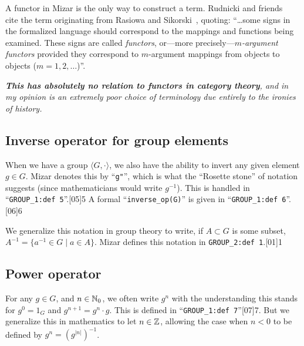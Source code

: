 \begin{remark}
A functor in Mizar is the only way to construct a term. Rudnicki and
friends~\cite{rudnicki2001commutative} cite the term originating from
Rasiowa and Sikorski~\cite[see p.148]{rasiowa1963mathematics},
quoting: ``\dots some signs in the formalized language should correspond
to the mappings and functions being examined. These signs are called
\emph{functors}, or---more precisely---\emph{$m$-argument functors}
provided they correspond to $m$-argument mappings from objects to
objects ($m = 1, 2, \dots$)''.

\emph{\textbf{This has absolutely no relation to functors in category theory},
and in my opinion is an extremely poor
choice of terminology due entirely to the ironies of history.}
\end{remark}

\subsection{Inverse operator for group elements}
When we have a group $\langle G,\cdot\rangle$, we also have the ability
to invert any given element $g\in G$. Mizar denotes this by
``\verb#g"#'', which is what the ``Rosette stone'' of notation suggests
(since mathematicians would write $g^{-1}$). This is handled in
``\verb#GROUP_1:def 5#''.[05]{5}
A formal ``\verb#inverse_op(G)#'' is given in
``\verb#GROUP_1:def 6#''.[06]{6}

\begin{remark}
We generalize this notation in group theory to write, if $A\subset G$ is
some subset, $A^{-1}=\{a^{-1}\in G\mid a\in A\}$. Mizar defines this
notation in \verb#GROUP_2:def 1#.[01]{1}
\end{remark}

\subsection{Power operator}
For any $g\in G$, and $n\in\mathbb{N}_{0}$, we often write $g^{n}$ with the
understanding this stands for $g^{0}=1_{G}$ and $g^{n+1}=g^{n}\cdot g$.
This is defined in ``\verb#GROUP_1:def 7#''[07]{7}. But we generalize this in
mathematics to let $n\in\mathbb{Z}$, allowing the case when $n<0$ to be defined
by $g^{n} = (g^{|n|})^{-1}$.

